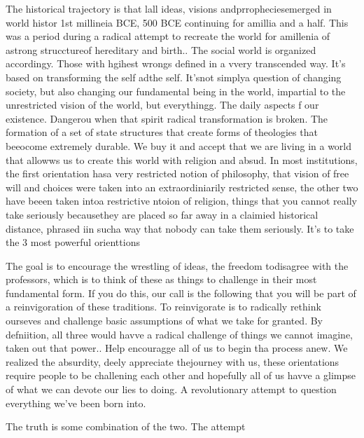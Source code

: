 \documentclass[12pt,letterpaper]{article}
\begin{document}
The historical trajectory is that lall ideas, visions andprropheciesemerged in world histor 1st millineia BCE, 500 BCE continuing for amillia and a half.  This was a period during a radical attempt to recreate the  world for amillenia of astrong strucctureof  hereditary and birth..  The social world is  organized accordingy.  Those with hgihest wrongs defined in a vvery transcended way.  It's based on transforming the self adthe self.  It'snot simplya  question of changing society, but also changing our fundamental being in the world, impartial to the unrestricted vision of the world, but everythingg.  The daily aspects f our existence.  Dangerou when that spirit  radical transformation is broken.  The formation of a set of state structures that create forms of theologies that beeocome extremely durable.  We buy it and accept that we are living in a world that allowws us to create this world with religion and absud.  
In most institutions, the first orientation hasa very restricted notion of philosophy, that vision of free will and choices were taken into an extraordiniarily restricted sense, the other two have beeen taken intoa restrictive ntoion of religion, things that you cannot really take seriously becausethey are placed so far away in a claimied historical distance, phrased iin sucha  way that nobody can take them seriously.  It's to take the 3 most powerful orienttions

The goal is to encourage the wrestling of ideas, the freedom todisagree with the professors, which is to think of these as things to challenge in their most fundamental form.  If you do this, our call is the following that you will be part of a reinvigoration of these traditions.  To reinvigorate is to radically rethink ourseves and challenge basic assumptions of what we take for granted.  By defniition, all three would havve a radical challenge of things we cannot imagine, taken out that power..  Help encouragge all of us to begin tha process anew.  We realized the absurdity, deely appreciate thejourney with us, these orientations require people to be challening each other and hopefully all of us havve a glimpse of what we can devote our lies to doing.  A revolutionary attempt to question everything we've been born into.

The truth is some combination of the two. 
The attempt
\end{document}
